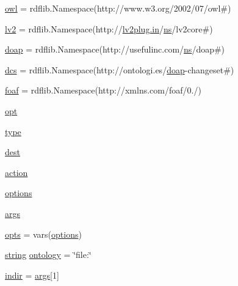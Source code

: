 \begin{DoxyCompactItemize}
\item 
\hyperlink{namespacelv2specgen_a3123d02015376b4a32a319bdd7357e11}{owl} = rdflib.\+Namespace(\textquotesingle{}http\+://www.\+w3.\+org/2002/07/owl\#\textquotesingle{})
\item 
\hyperlink{namespacelv2specgen_a38ea88c9c510b7121393afe2a23c02bc}{lv2} = rdflib.\+Namespace(\textquotesingle{}http\+://\hyperlink{latency_8c_a7d946209d777cb95fe30364b8d321207}{lv2plug.\+in}/\hyperlink{xmltok_8c_ab6aec1346fb6c7b2733f0f73c9536ad2}{ns}/lv2core\#\textquotesingle{})
\item 
\hyperlink{namespacelv2specgen_a1dfdd8c7e93b078e9798d1d1074d85e0}{doap} = rdflib.\+Namespace(\textquotesingle{}http\+://usefulinc.\+com/\hyperlink{xmltok_8c_ab6aec1346fb6c7b2733f0f73c9536ad2}{ns}/doap\#\textquotesingle{})
\item 
\hyperlink{namespacelv2specgen_a731399ef9a73cb8a99da5833de959594}{dcs} = rdflib.\+Namespace(\textquotesingle{}http\+://ontologi.\+es/\hyperlink{namespacelv2specgen_a1dfdd8c7e93b078e9798d1d1074d85e0}{doap}-\/changeset\#\textquotesingle{})
\item 
\hyperlink{namespacelv2specgen_a1b9c82d5c0db55e05beed3a7d86eca84}{foaf} = rdflib.\+Namespace(\textquotesingle{}http\+://xmlns.\+com/foaf/0./\textquotesingle{})
\item 
\hyperlink{namespacelv2specgen_ae29432791328f0b87bdf9b9b475b79cb}{opt}
\item 
\hyperlink{namespacelv2specgen_a581a048e7ac439435d67c2f1ce03d637}{type}
\item 
\hyperlink{namespacelv2specgen_af69976955f051ccef12ad2f85392e818}{dest}
\item 
\hyperlink{namespacelv2specgen_a7dac92a6e76f9cbfb25e902b88b09867}{action}
\item 
\hyperlink{namespacelv2specgen_a32e0c38ade65159ec3ff05fe9bcd4d27}{options}
\item 
\hyperlink{namespacelv2specgen_a022f620722f1029244a92eca556aa50a}{args}
\item 
\hyperlink{namespacelv2specgen_a3418d48f73144afbd9db69c0c1aaf6b8}{opts} = vars(\hyperlink{namespacelv2specgen_a32e0c38ade65159ec3ff05fe9bcd4d27}{options})
\item 
\hyperlink{test__lib_f_l_a_c_2format_8c_ab02026ad0de9fb6c1b4233deb0a00c75}{string} \hyperlink{namespacelv2specgen_a5adf9e932c2700472369ca8590e9eede}{ontology} = \char`\"{}file\+:\char`\"{}
\item 
\hyperlink{namespacelv2specgen_afced2c0f6d1b740f15b5645236267468}{indir} = \hyperlink{namespacelv2specgen_a022f620722f1029244a92eca556aa50a}{args}\mbox{[}1\mbox{]}

\end{DoxyCompactItemize}
